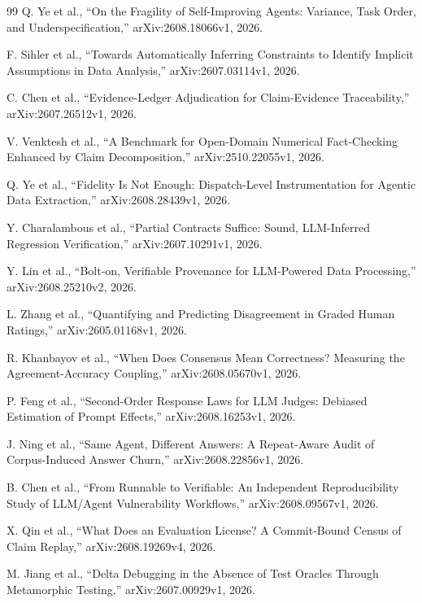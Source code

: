\documentclass[11pt,a4paper]{article}
\begin{document}
\begin{thebibliography}{99}
Q. Ye et al., ``On the Fragility of Self-Improving Agents: Variance, Task Order, and Underspecification,'' arXiv:2608.18066v1, 2026.

F. Sihler et al., ``Towards Automatically Inferring Constraints to Identify Implicit Assumptions in Data Analysis,'' arXiv:2607.03114v1, 2026.

C. Chen et al., ``Evidence-Ledger Adjudication for Claim-Evidence Traceability,'' arXiv:2607.26512v1, 2026.

V. Venktesh et al., ``A Benchmark for Open-Domain Numerical Fact-Checking Enhanced by Claim Decomposition,'' arXiv:2510.22055v1, 2026.

Q. Ye et al., ``Fidelity Is Not Enough: Dispatch-Level Instrumentation for Agentic Data Extraction,'' arXiv:2608.28439v1, 2026.

Y. Charalambous et al., ``Partial Contracts Suffice: Sound, LLM-Inferred Regression Verification,'' arXiv:2607.10291v1, 2026.

Y. Lin et al., ``Bolt-on, Verifiable Provenance for LLM-Powered Data Processing,'' arXiv:2608.25210v2, 2026.

L. Zhang et al., ``Quantifying and Predicting Disagreement in Graded Human Ratings,'' arXiv:2605.01168v1, 2026.

R. Khanbayov et al., ``When Does Consensus Mean Correctness? Measuring the Agreement-Accuracy Coupling,'' arXiv:2608.05670v1, 2026.

P. Feng et al., ``Second-Order Response Laws for LLM Judges: Debiased Estimation of Prompt Effects,'' arXiv:2608.16253v1, 2026.

J. Ning et al., ``Same Agent, Different Answers: A Repeat-Aware Audit of Corpus-Induced Answer Churn,'' arXiv:2608.22856v1, 2026.

B. Chen et al., ``From Runnable to Verifiable: An Independent Reproducibility Study of LLM/Agent Vulnerability Workflows,'' arXiv:2608.09567v1, 2026.

X. Qin et al., ``What Does an Evaluation License? A Commit-Bound Census of Claim Replay,'' arXiv:2608.19269v4, 2026.

M. Jiang et al., ``Delta Debugging in the Absence of Test Oracles Through Metamorphic Testing,'' arXiv:2607.00929v1, 2026.


\end{thebibliography}
\end{document}
